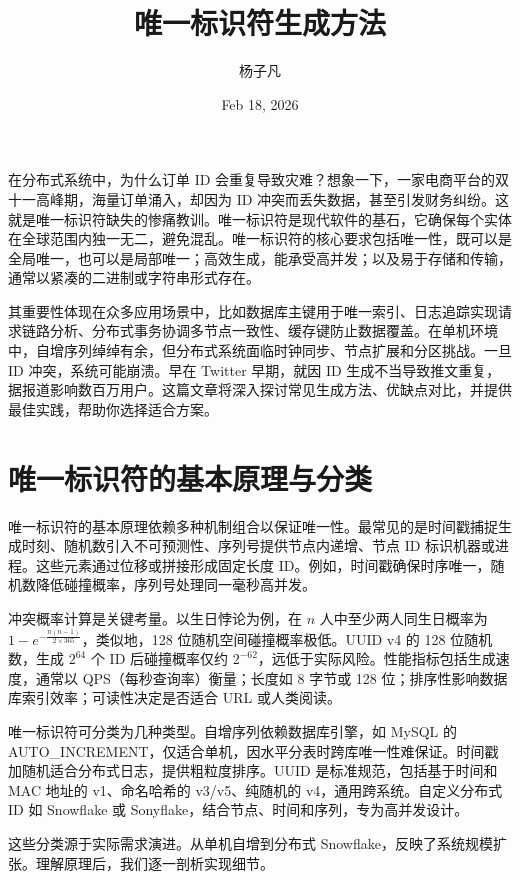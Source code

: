 \title{唯一标识符生成方法}
\author{杨子凡}
\date{Feb 18, 2026}
\maketitle
在分布式系统中，为什么订单 ID 会重复导致灾难？想象一下，一家电商平台的双十一高峰期，海量订单涌入，却因为 ID 冲突而丢失数据，甚至引发财务纠纷。这就是唯一标识符缺失的惨痛教训。唯一标识符是现代软件的基石，它确保每个实体在全球范围内独一无二，避免混乱。唯一标识符的核心要求包括唯一性，既可以是全局唯一，也可以是局部唯一；高效生成，能承受高并发；以及易于存储和传输，通常以紧凑的二进制或字符串形式存在。\par
其重要性体现在众多应用场景中，比如数据库主键用于唯一索引、日志追踪实现请求链路分析、分布式事务协调多节点一致性、缓存键防止数据覆盖。在单机环境中，自增序列绰绰有余，但分布式系统面临时钟同步、节点扩展和分区挑战。一旦 ID 冲突，系统可能崩溃。早在 Twitter 早期，就因 ID 生成不当导致推文重复，据报道影响数百万用户。这篇文章将深入探讨常见生成方法、优缺点对比，并提供最佳实践，帮助你选择适合方案。\par
\chapter{唯一标识符的基本原理与分类}
唯一标识符的基本原理依赖多种机制组合以保证唯一性。最常见的是时间戳捕捉生成时刻、随机数引入不可预测性、序列号提供节点内递增、节点 ID 标识机器或进程。这些元素通过位移或拼接形成固定长度 ID。例如，时间戳确保时序唯一，随机数降低碰撞概率，序列号处理同一毫秒高并发。\par
冲突概率计算是关键考量。以生日悖论为例，在 $n$ 人中至少两人同生日概率为 $1 - e^{-\frac{n(n-1)}{2 \times 365}}$，类似地，128 位随机空间碰撞概率极低。UUID v4 的 128 位随机数，生成 $2^{64}$ 个 ID 后碰撞概率仅约 $2^{-62}$，远低于实际风险。性能指标包括生成速度，通常以 QPS（每秒查询率）衡量；长度如 8 字节或 128 位；排序性影响数据库索引效率；可读性决定是否适合 URL 或人类阅读。\par
唯一标识符可分类为几种类型。自增序列依赖数据库引擎，如 MySQL 的 AUTO\_{}INCREMENT，仅适合单机，因水平分表时跨库唯一性难保证。时间戳加随机适合分布式日志，提供粗粒度排序。UUID 是标准规范，包括基于时间和 MAC 地址的 v1、命名哈希的 v3/v5、纯随机的 v4，通用跨系统。自定义分布式 ID 如 Snowflake 或 Sonyflake，结合节点、时间和序列，专为高并发设计。\par
这些分类源于实际需求演进。从单机自增到分布式 Snowflake，反映了系统规模扩张。理解原理后，我们逐一剖析实现细节。\par
